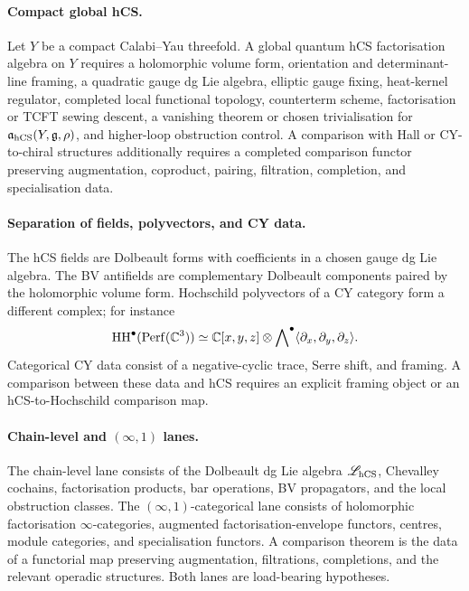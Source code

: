 \paragraph{Compact global hCS.}
Let \(Y\) be a compact Calabi--Yau threefold. A global quantum hCS
factorisation algebra on \(Y\) requires a holomorphic volume form,
orientation and determinant-line framing, a quadratic gauge dg Lie
algebra, elliptic gauge fixing, heat-kernel regulator, completed local
functional topology, counterterm scheme, factorisation or TCFT sewing
descent, a vanishing theorem or chosen trivialisation for
\(\mathfrak a_{\mathrm{hCS}}(Y,\mathfrak{g},\rho)\), and higher-loop obstruction control.
A comparison with Hall or CY-to-chiral structures additionally requires
a completed comparison functor preserving augmentation, coproduct,
pairing, filtration, completion, and specialisation data.

\paragraph{Separation of fields, polyvectors, and CY data.}
The hCS fields are Dolbeault forms with coefficients in a chosen gauge
dg Lie algebra. The BV antifields are complementary Dolbeault
components paired by the holomorphic volume form. Hochschild
polyvectors of a CY category form a different complex; for instance
\[
  \mathrm{HH}^\bullet(\mathrm{Perf}(\mathbb{C}^3))
  \simeq
  \mathbb{C}[x,y,z]\otimes
  \bigwedge\nolimits^\bullet
  \langle\partial_x,\partial_y,\partial_z\rangle .
\]
Categorical CY data consist of a negative-cyclic trace, Serre shift,
and framing. A comparison between these data and hCS requires an
explicit framing object or an hCS-to-Hochschild comparison map.

\paragraph{Chain-level and \texorpdfstring{$(\infty,1)$}{(infinity,1)} lanes.}
The chain-level lane consists of the Dolbeault dg Lie algebra
\(\mathscr L_{\mathrm{hCS}}\), Chevalley cochains, factorisation products, bar
operations, BV propagators, and the local obstruction classes. The
\((\infty,1)\)-categorical lane consists of holomorphic factorisation
\(\infty\)-categories, augmented factorisation-envelope functors,
centres, module categories, and specialisation functors. A comparison
theorem is the data of a functorial map preserving augmentation,
filtrations, completions, and the relevant operadic structures. Both
lanes are load-bearing hypotheses.

